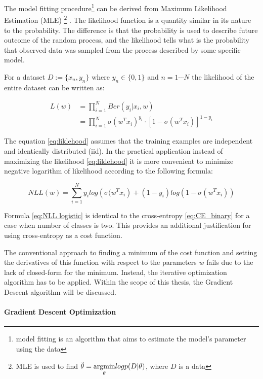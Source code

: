 The model fitting procedure\footnote{model fitting is an algorithm that aims to estimate the model's parameter using the data } can be derived from Maximum Likelihood Estimation (MLE) \footnote{ MLE is used to find $\Tilde{\theta} = \underset{\theta}{\mathrm{argmin}} log p(D|\theta)$, where $D$ is a data} \cite{bishop}. The likelihood function is a quantity similar in its nature to the probability. The difference is that the probability is used to describe future outcome of the random process, and the likelihood tells what is the probability that observed data was sampled from the process described by some specific model.  

For a dataset $D:=\{x_{n}, y_n\}$ where $y_{n} \in \{0,1\}$ and $n=1 \cdots N$ the likelihood of the entire dataset can be written as: 

\begin{align}
\label{eq:liklehood}
        L(w) &= \prod_{i=1}^{N} Ber(y_i|x_i, w) \nonumber \\
        &= \prod_{i=1}^{N} \sigma(w^{T}x_i)^{y_i}\cdot \left[1- \sigma(w^{T}x_i) \right]^{1-y_i}
\end{align}

The equation \ref{eq:liklehood} assumes that the training examples are independent and identically distributed (iid). In the practical application instead of maximizing the likelihood \ref{eq:liklehood} it is more convenient to minimize negative logarithm of likelihood according to the following formula:

\begin{equation}
\label{eq:NLL logistic}
    NLL(w) = \sum_{i=1}^{N}y_{i}log\left( \sigma(w^{T}x_{i}\right)+(1-y_i)log(1-\sigma(w^{T}x_{i}))
\end{equation}

Formula \ref{eq:NLL logistic} is identical to the cross-entropy \ref{eq:CE_binary} for a case when number of classes is two. This provides an additional justification for using cross-entropy as a cost function. 

The conventional approach to finding a minimum of the cost function and setting the derivatives of this function with respect to the parameters $w$ fails due to the lack of closed-form for the minimum. Instead, the iterative optimization algorithm has to be applied. Within the scope of this thesis, the Gradient Descent algorithm will be discussed.    

\paragraph{Gradient Descent Optimization} \mbox{}

